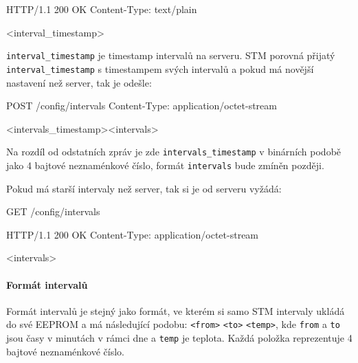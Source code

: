 \begin{packetserver}
HTTP/1.1 200 OK
Content-Type: text/plain

<interval_timestamp>
\end{packetserver}

\texttt{interval\_timestamp} je timestamp intervalů na serveru.
STM porovná přijatý \texttt{interval\_timestamp} s timestampem svých intervalů a pokud má novější nastavení
než server, tak je odešle:
\begin{packetstm}
POST /config/intervals
Content-Type: application/octet-stream

<intervals_timestamp><intervals>
\end{packetstm}

Na rozdíl od odstatních zpráv je zde \texttt{intervals\_timestamp} v binárních podobě jako 4 bajtové
neznaménkové číslo, formát \texttt{intervals} bude zmíněn později.

Pokud má starší intervaly než server, tak si je od serveru vyžádá:
\begin{packetstm}
GET /config/intervals
\end{packetstm}

\begin{packetserver}
HTTP/1.1 200 OK
Content-Type: application/octet-stream

<intervals>
\end{packetserver}

\paragraph{Formát intervalů}
Formát intervalů je stejný jako formát, ve kterém si samo STM intervaly ukládá do své EEPROM a
má následující podobu:
\texttt{<from>} \texttt{<to>} \texttt{<temp>}, kde \texttt{from} a \texttt{to} jsou
časy v minutách v rámci dne a \texttt{temp} je teplota.
Každá položka reprezentuje 4 bajtové neznaménkové číslo.
